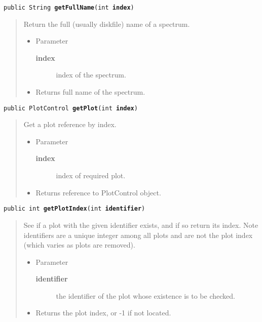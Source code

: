 \documentclass[twoside,11pt,nolof]{starlink}
\providecommand{\method}[1]{\texttt{#1}}
\newenvironment{desc}{\begin{quote}}{\end{quote}}
\begin{document}
\method{public String \textbf{getFullName}(\texttt{int} \textbf{index})\label{l279}\label{l280}}
\begin{desc}Return the full (usually diskfile) name of a spectrum.
\begin{itemize}
\item{Parameter
  \begin{description}
   \item[\textbf{index}]{index of the spectrum.}
  \end{description}}
\end{itemize}
\begin{itemize}
\item{Returns full name of the spectrum. }
\end{itemize}
\end{desc}

\method{public PlotControl \textbf{getPlot}(\texttt{int} \textbf{index})\label{l281}\label{l282}}
\begin{desc}Get a plot reference by index.
\begin{itemize}
\item{Parameter
  \begin{description}
   \item[\textbf{index}]{index of required plot.}
  \end{description}}
\end{itemize}
\begin{itemize}
\item{Returns reference to PlotControl object. }
\end{itemize}
\end{desc}

\method{public int \textbf{getPlotIndex}(\texttt{int} \textbf{identifier})\label{l283}\label{l284}}
\begin{desc}See if a plot with the given identifier exists, and if so
 return its index. Note identifiers are a unique integer among
 all plots and are not the plot index (which varies as plots are
 removed).
\begin{itemize}
\item{Parameter
  \begin{description}
   \item[\textbf{identifier}]{the identifier of the plot whose existence is
                   to be checked.}
  \end{description}}
\end{itemize}
\begin{itemize}
\item{Returns the plot index, or -1 if not located. }
\end{itemize}
\end{desc}
\end{document}
